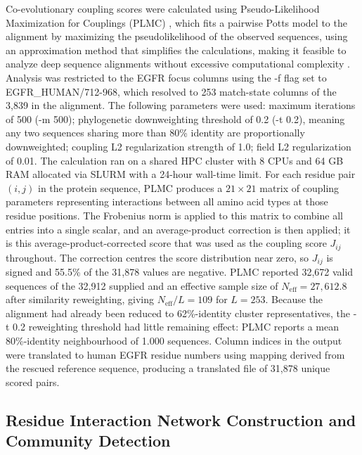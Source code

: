 \documentclass[utf8]{FrontiersinHarvard}
\begin{document}
Co-evolutionary coupling scores were calculated using Pseudo-Likelihood Maximization for Couplings (PLMC) \citep{Hopf2017}, which fits a pairwise Potts model to the alignment by maximizing the pseudolikelihood of the observed sequences, using an approximation method that simplifies the calculations, making it feasible to analyze deep sequence alignments without excessive computational complexity \citep{Ekeberg2013}. Analysis was restricted to the EGFR focus columns using the -f flag set to EGFR\_HUMAN/712-968, which resolved to 253 match-state columns of the 3,839 in the alignment. The following parameters were used: maximum iterations of 500 (-m 500); phylogenetic downweighting threshold of 0.2 (-t 0.2), meaning any two sequences sharing more than 80\% identity are proportionally downweighted; coupling L2 regularization strength of 1.0; field L2 regularization of 0.01. The calculation ran on a shared HPC cluster with 8 CPUs and 64 GB RAM allocated via SLURM with a 24-hour wall-time limit. For each residue pair $(i, j)$ in the protein sequence, PLMC produces a $21\times21$ matrix of coupling parameters representing interactions between all amino acid types at those residue positions. The Frobenius norm is applied to this matrix to combine all entries into a single scalar, and an average-product correction is then applied; it is this average-product-corrected score that was used as the coupling score $J_{ij}$ throughout. The correction centres the score distribution near zero, so $J_{ij}$ is signed and 55.5\% of the 31,878 values are negative. PLMC reported 32,672 valid sequences of the 32,912 supplied and an effective sample size of $N_{\mathrm{eff}} = 27{,}612.8$ after similarity reweighting, giving $N_{\mathrm{eff}}/L = 109$ for $L = 253$. Because the alignment had already been reduced to 62\%-identity cluster representatives, the -t 0.2 reweighting threshold had little remaining effect: PLMC reports a mean 80\%-identity neighbourhood of 1.000 sequences. Column indices in the output were translated to human EGFR residue numbers using mapping derived from the rescued reference sequence, producing a translated file of 31,878 unique scored pairs.

\subsection{Residue Interaction Network Construction and Community Detection}
\end{document}
